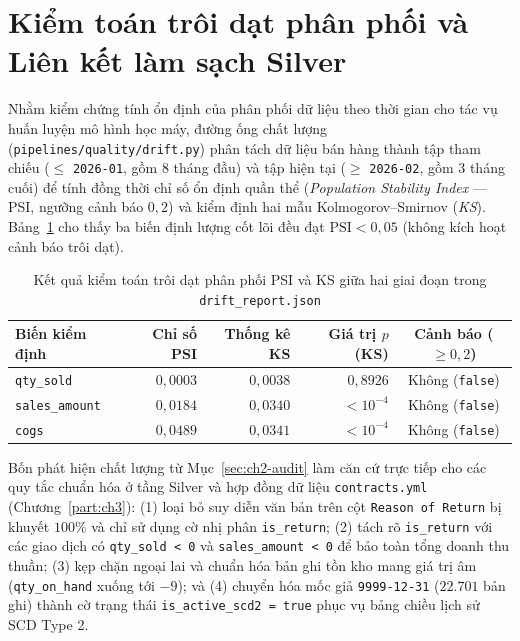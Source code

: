 \section{Kiểm toán trôi dạt phân phối và Liên kết làm sạch Silver}
\label{sec:ch2-drift}
Nhằm kiểm chứng tính ổn định của phân phối dữ liệu theo thời gian cho tác vụ huấn luyện mô hình học máy, đường ống chất lượng (\texttt{pipelines/quality/drift.py}) phân tách dữ liệu bán hàng thành tập tham chiếu ($\le$ \texttt{2026-01}, gồm $8$ tháng đầu) và tập hiện tại ($\ge$ \texttt{2026-02}, gồm $3$ tháng cuối) để tính đồng thời chỉ số ổn định quần thể (\textit{Population Stability Index} --- PSI, ngưỡng cảnh báo $0{,}2$) và kiểm định hai mẫu Kolmogorov--Smirnov (\textit{KS}). Bảng~\ref{tab:eda-drift} cho thấy ba biến định lượng cốt lõi đều đạt $\text{PSI} < 0{,}05$ (không kích hoạt cảnh báo trôi dạt).

\begin{table}[H]
	\centering
	\footnotesize
	\begin{tabular}{l r r r c}
		\toprule
		\textbf{Biến kiểm định}           & \textbf{Chỉ số PSI} & \textbf{Thống kê KS} & \textbf{Giá trị $p$ (KS)} & \textbf{Cảnh báo ($\ge 0{,}2$)}  \\
		\midrule
		\texttt{qty_sold}     & $0{,}0003$          & $0{,}0038$           & $0{,}8926$                & Không (\texttt{false}) \\
		\texttt{sales_amount} & $0{,}0184$          & $0{,}0340$           & $< 10^{-4}$               & Không (\texttt{false}) \\
		\texttt{cogs}           & $0{,}0489$          & $0{,}0341$           & $< 10^{-4}$               & Không (\texttt{false}) \\
		\bottomrule
	\end{tabular}
	\caption{Kết quả kiểm toán trôi dạt phân phối PSI và KS giữa hai giai đoạn trong \texttt{drift\_report.json}}
	\label{tab:eda-drift}
\end{table}

Bốn phát hiện chất lượng từ Mục~\ref{sec:ch2-audit} làm căn cứ trực tiếp cho các quy tắc chuẩn hóa ở tầng Silver và hợp đồng dữ liệu \texttt{contracts.yml} (Chương~\ref{part:ch3}): (1) loại bỏ suy diễn văn bản trên cột \texttt{Reason of Return} bị khuyết $100\%$ và chỉ sử dụng cờ nhị phân \texttt{is_return}; (2) tách rõ \texttt{is_return} với các giao dịch có \texttt{qty_sold < 0} và \texttt{sales_amount < 0} để bảo toàn tổng doanh thu thuần; (3) kẹp chặn ngoại lai và chuẩn hóa bản ghi tồn kho mang giá trị âm (\texttt{qty_on_hand} xuống tới $-9$); và (4) chuyển hóa mốc giả \texttt{9999-12-31} ($22.701$ bản ghi) thành cờ trạng thái \texttt{is_active_scd2 = true} phục vụ bảng chiều lịch sử SCD Type 2.

